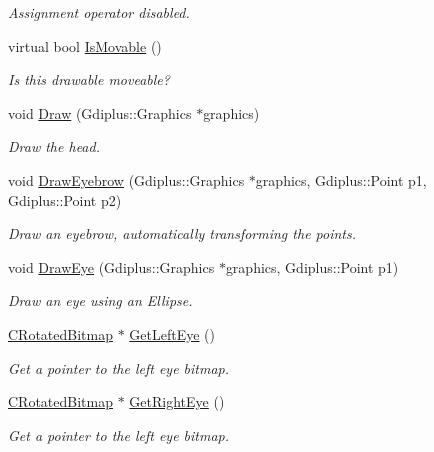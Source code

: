 \begin{DoxyCompactItemize}
\begin{DoxyCompactList}\small\item\em Assignment operator disabled. \end{DoxyCompactList}\item 
virtual bool \hyperlink{class_c_head_top_a853b7d9f248dc36519f1da6c4d53b18e}{Is\+Movable} ()
\begin{DoxyCompactList}\small\item\em Is this drawable moveable? \end{DoxyCompactList}\item 
void \hyperlink{class_c_head_top_aa77d9fa703079ee68a4e4e8e3c816932}{Draw} (Gdiplus\+::\+Graphics $\ast$graphics)
\begin{DoxyCompactList}\small\item\em Draw the head. \end{DoxyCompactList}\item 
void \hyperlink{class_c_head_top_ad774e7f2bf3e5ca5e1fdf36d61a2d146}{Draw\+Eyebrow} (Gdiplus\+::\+Graphics $\ast$graphics, Gdiplus\+::\+Point p1, Gdiplus\+::\+Point p2)
\begin{DoxyCompactList}\small\item\em Draw an eyebrow, automatically transforming the points. \end{DoxyCompactList}\item 
void \hyperlink{class_c_head_top_a01e507dfcc8cad78070a1a043c4d1593}{Draw\+Eye} (Gdiplus\+::\+Graphics $\ast$graphics, Gdiplus\+::\+Point p1)
\begin{DoxyCompactList}\small\item\em Draw an eye using an Ellipse. \end{DoxyCompactList}\item 
\hyperlink{class_c_rotated_bitmap}{C\+Rotated\+Bitmap} $\ast$ \hyperlink{class_c_head_top_a7e95969a73f21d5c903e063327fc9ceb}{Get\+Left\+Eye} ()
\begin{DoxyCompactList}\small\item\em Get a pointer to the left eye bitmap. \end{DoxyCompactList}\item 
\hyperlink{class_c_rotated_bitmap}{C\+Rotated\+Bitmap} $\ast$ \hyperlink{class_c_head_top_a8c1d433844eece9162dee0692ffca34b}{Get\+Right\+Eye} ()
\begin{DoxyCompactList}\small\item\em Get a pointer to the left eye bitmap. \end{DoxyCompactList}\item 

\end{DoxyCompactItemize}
